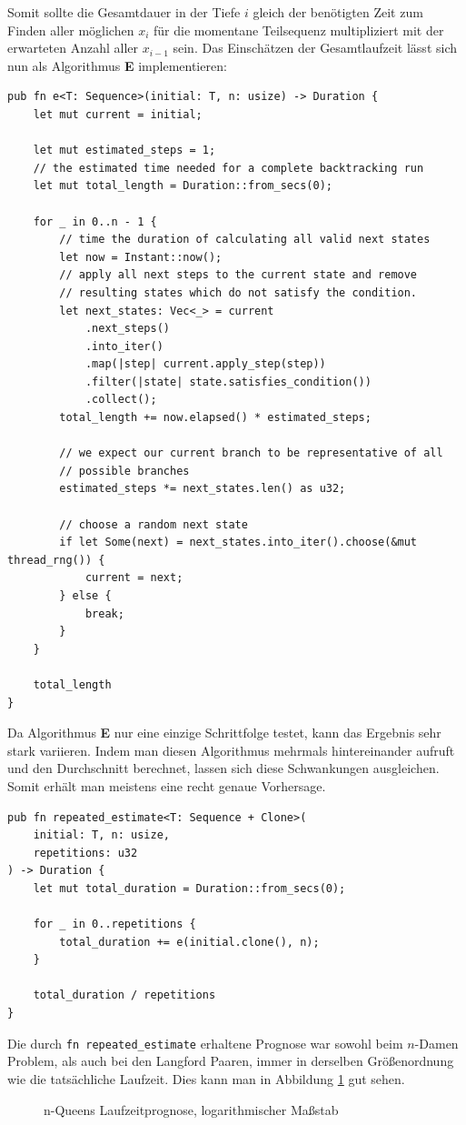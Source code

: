 Somit sollte die Gesamtdauer in der Tiefe $i$ gleich der benötigten Zeit zum Finden aller
möglichen $x_{i}$ für die momentane Teilsequenz multipliziert mit der erwarteten Anzahl aller $x_{i-1}$ sein.
Das Einschätzen der Gesamtlaufzeit lässt sich nun als Algorithmus \textbf{E} implementieren:
\begin{verbatim}
pub fn e<T: Sequence>(initial: T, n: usize) -> Duration {
    let mut current = initial;

    let mut estimated_steps = 1;
    // the estimated time needed for a complete backtracking run
    let mut total_length = Duration::from_secs(0);

    for _ in 0..n - 1 {
        // time the duration of calculating all valid next states
        let now = Instant::now();
        // apply all next steps to the current state and remove
        // resulting states which do not satisfy the condition.
        let next_states: Vec<_> = current
            .next_steps()
            .into_iter()
            .map(|step| current.apply_step(step))
            .filter(|state| state.satisfies_condition())
            .collect();
        total_length += now.elapsed() * estimated_steps;

        // we expect our current branch to be representative of all
        // possible branches
        estimated_steps *= next_states.len() as u32;

        // choose a random next state
        if let Some(next) = next_states.into_iter().choose(&mut thread_rng()) {
            current = next;
        } else {
            break;
        }
    }

    total_length
}
\end{verbatim}

Da Algorithmus \textbf{E} nur eine einzige Schrittfolge testet, kann das Ergebnis
sehr stark variieren. Indem man diesen Algorithmus mehrmals hintereinander aufruft und
den Durchschnitt berechnet, lassen sich diese Schwankungen ausgleichen. Somit erhält man
meistens eine recht genaue Vorhersage.
\begin{verbatim}
pub fn repeated_estimate<T: Sequence + Clone>(
    initial: T, n: usize,
    repetitions: u32
) -> Duration {
    let mut total_duration = Duration::from_secs(0);

    for _ in 0..repetitions {
        total_duration += e(initial.clone(), n);
    }

    total_duration / repetitions
}
\end{verbatim}
Die durch \texttt{fn repeated_estimate} erhaltene Prognose war sowohl beim $n$-Damen Problem, als auch bei den Langford Paaren, immer
in derselben Größenordnung wie die tatsächliche Laufzeit. Dies kann man in Abbildung \ref{estimate} gut sehen.
\begin{figure}
    \centering
    
    \caption{n-Queens Laufzeitprognose, logarithmischer Maßstab}
    \label{estimate}
  \end{figure}